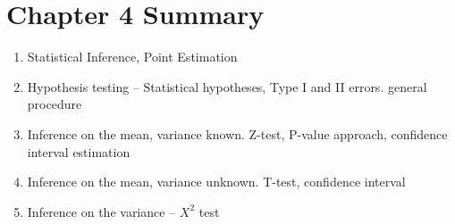 \documentclass[12pt]{amsart}
\begin{document}
\section*{Chapter 4 Summary}

\begin{enumerate}

\item Statistical Inference, Point Estimation

\item Hypothesis testing -- Statistical hypotheses, Type I and II errors. general procedure

\item Inference on the mean, variance known. Z-test, P-value approach, confidence interval estimation

\item Inference on the mean, variance unknown. T-test, confidence interval

\item Inference on the variance -- $X^{2}$ test

\end{enumerate}
\end{document}
